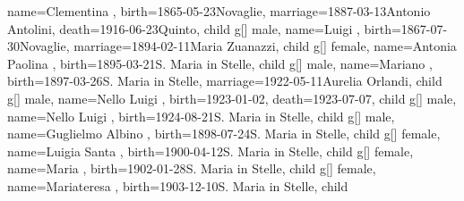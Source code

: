 \documentclass{article}
\begin{document}
\begin{midpage}
\begin{center}
\begin{genealogypicture}
{{{{{                    name={Clementina },
                    birth={1865-05-23}{Novaglie},
                    marriage={1887-03-13}{Antonio Antolini},
                    death={1916-06-23}{Quinto},
                }
            }
            child{
                g[]{
                    male,
                    name={Luigi },
                    birth={1867-07-30}{Novaglie},
                    marriage={1894-02-11}{Maria Zuanazzi},
                }
                child{
                    g[]{
                        female,
                        name={Antonia Paolina },
                        birth={1895-03-21}{S. Maria in Stelle},
                    }
                }
                child{
                    g[]{
                        male,
                        name={Mariano },
                        birth={1897-03-26}{S. Maria in Stelle},
                        marriage={1922-05-11}{Aurelia Orlandi},
                    }
                    child{
                        g[]{
                            male,
                            name={Nello Luigi },
                            birth={1923-01-02}{},
                            death={1923-07-07}{},
                        }
                    }
                    child{
                        g[]{
                            male,
                            name={Nello Luigi },
                            birth={1924-08-21}{S. Maria in Stelle},
                        }
                    }
                }
                child{
                    g[]{
                        male,
                        name={Guglielmo Albino },
                        birth={1898-07-24}{S. Maria in Stelle},
                    }
                }
                child{
                    g[]{
                        female,
                        name={Luigia Santa },
                        birth={1900-04-12}{S. Maria in Stelle},
                    }
                }
                child{
                    g[]{
                        female,
                        name={Maria },
                        birth={1902-01-28}{S. Maria in Stelle},
                    }
                }
                child{
                    g[]{
                        female,
                        name={Mariateresa },
                        birth={1903-12-10}{S. Maria in Stelle},
                    }
                }
                child{
}}}}}
\end{genealogypicture}
\end{center}
\end{midpage}
\end{document}
